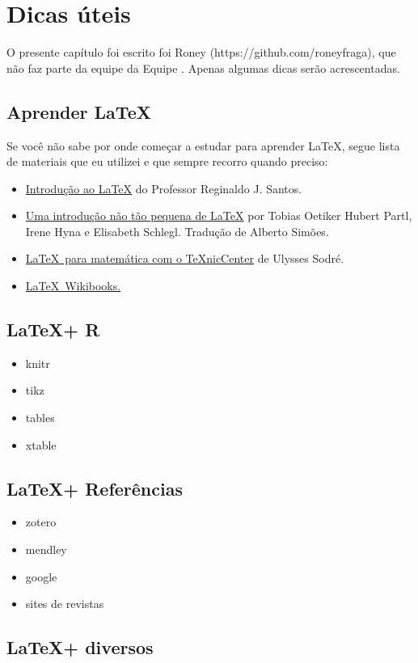\chapter{Dicas úteis}\label{cap_dicas}

O presente capítulo foi escrito foi Roney (https://github.com/roneyfraga), que não faz parte da equipe da Equipe \abnTeX . Apenas algumas dicas serão acrescentadas.

\section{Aprender \LaTeX }
Se você não sabe por onde começar a estudar para aprender \LaTeX, segue lista de materiais que eu utilizei e que sempre recorro quando preciso:

\begin{itemize}
    \item \href{http://www.mat.ufmg.br/~regi/topicos/intlat.pdf}{Introdução ao \LaTeX} do Professor Reginaldo J. Santos.
    \item \href{http://zelmanov.ptep-online.com/ctan/lshort_port.pdf}{Uma introdução não tão pequena de \LaTeX} por Tobias Oetiker Hubert Partl, Irene Hyna e Elisabeth Schlegl. Tradução de Alberto Simões.
    \item \href{http://www.uel.br/projetos/matessencial/superior/pdfs/latexmat.pdf}{\LaTeX\ para matemática com o TeXnicCenter} de Ulysses Sodré.
    \item \href{http://en.wikibooks.org/wiki/LaTeX}{\LaTeX\ Wikibooks.}
\end{itemize}

\section{\LaTeX + R}

\begin{itemize}
    \item knitr
    \item tikz
    \item tables
    \item xtable
\end{itemize}

\section{\LaTeX + Referências}

\begin{itemize}
    \item zotero
    \item mendley
    \item google
    \item sites de revistas
\end{itemize}

\section{\LaTeX + diversos}

